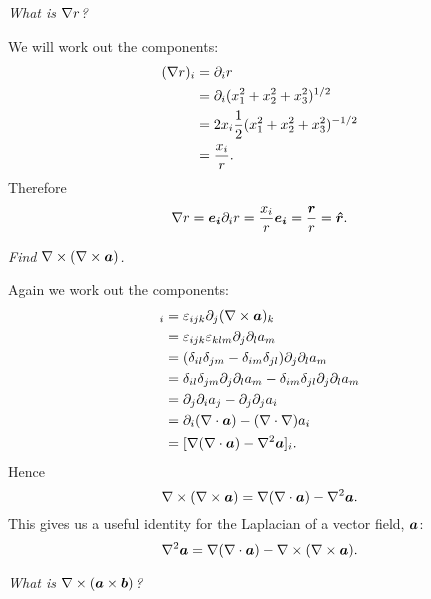 \documentclass[a4paper]{article}
\begin{document}
    \begin{example}
        \textit{What is \(\nabla r\)?}
        
        We will work out the components:
        \begin{align*}
            (\nabla r)_i &= \partial_i r\\
            &= \partial_i(x_1^2 + x_2^2 + x_3^2)^{1/2}\\
            &= 2x_i\frac{1}{2}(x_1^2 + x_2^2 + x_3^2)^{-1/2}\\
            &= \frac{x_i}{r}.
        \end{align*}
        Therefore
        \[\nabla r = \bm{e_{i}}\partial_i r = \frac{x_i}{r}\bm{e_{i}} = \frac{\bm{r}}{r} = \bm{\hat{r}}.\]
        
        \textit{Find \(\nabla\times(\nabla\times\bm{a})\).}
        
        Again we work out the components:
        \begin{align*}
            [\curl(\curl\vv{a})]_i &= \varepsilon_{ijk}\partial_j(\curl\vv{a})_k\\
            &= \varepsilon_{ijk}\varepsilon_{klm}\partial_j\partial_la_m\\
            &= (\delta_{il}\delta_{jm} - \delta_{im}\delta_{jl})\partial_j\partial_la_m\\
            &= \delta_{il}\delta_{jm}\partial_j\partial_la_m - \delta_{im}\delta_{jl}\partial_j\partial_la_m\\
            &= \partial_j\partial_ia_j - \partial_j\partial_ja_i\\
            &= \partial_i(\div\vv{a}) - (\div\grad)a_i\\
            &= [\grad(\div\vv{a}) - \laplacian\vv{a}]_i.
        \end{align*}
        Hence
        \[\nabla\times(\nabla\times\bm{a}) = \nabla(\nabla\cdot\bm{a}) - \nabla^2\bm{a}.\]
        This gives us a useful identity for the Laplacian of a vector field, \(\bm{a}\):
        \[\nabla^2\bm{a} = \nabla(\nabla\cdot\bm{a}) - \nabla\times(\nabla\times\bm{a}).\]
        
        \textit{What is \(\nabla\times(\bm{a}\times\bm{b})\)?}
        

\end{example}
\end{document}
